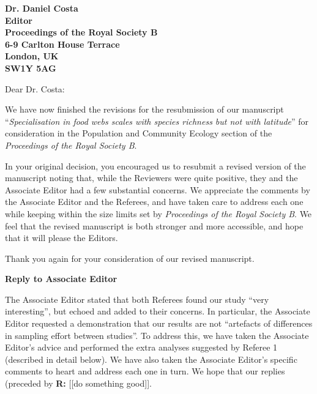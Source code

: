 \documentclass[12pt]{letter}
\newcommand{\mytitle}{\emph{Specialisation in food webs scales with species richness but not with latitude}}
\newcommand{\myjournal}{\emph{Proceedings of the Royal Society B}}
\begin{document}
\begin{letter}{\bf Dr. Daniel Costa\\
               Editor\\
               Proceedings of the Royal Society B\\
               6-9 Carlton House Terrace\\
               London, UK\\
               SW1Y 5AG\\
                }

\opening{Dear Dr. Costa:}

We have now finished the revisions for the resubmission of our manuscript
``\mytitle'' for consideration in the Population and Community Ecology section
of the \myjournal. 

In your original decision, you encouraged us to resubmit a revised version of
the manuscript noting that, while the Reviewers were quite positive, they and
the Associate Editor had a few substantial concerns. We appreciate the
comments by the Associate Editor and the Referees, and have taken care to
address each one while keeping within the size limits set by \myjournal. We
feel that the revised manuscript is both stronger and more accessible, and
hope that it will please the Editors.


Thank you again for your consideration of our revised manuscript.



\end{letter}

\newpage

\setcounter{page}{1}


{\Large \bf Reply to Associate Editor}

  The Associate Editor stated that both Referees found our study ``very
  interesting'', but echoed and added to their concerns. In particular, the
  Associate Editor requested a demonstration that our results are not
  ``artefacts of differences in sampling effort between studies''. To address
  this, we have taken the Associate Editor's advice and performed the extra
  analyses suggested by Referee 1 (described in detail below). We have also
  taken the Associate Editor's specific comments to heart and address each one
  in turn. We hope that our replies (preceded by \textbf{R:} [[do something
  good]].
\end{document}
